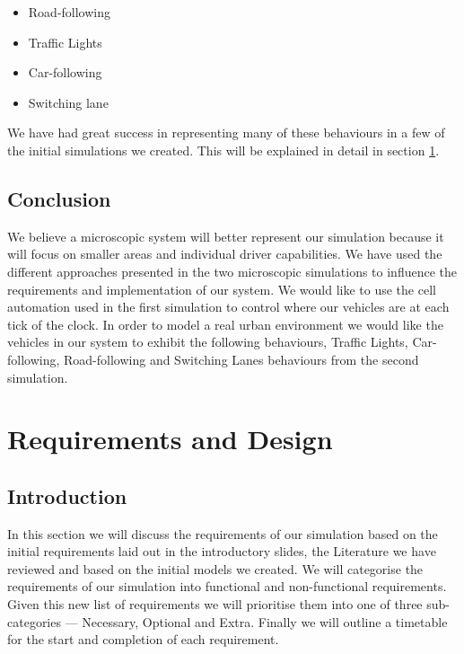 \documentclass{article}
\begin{document}
	\begin{itemize}
		\item Road-following
		\item Traffic Lights
		\item Car-following
		\item Switching lane
	\end{itemize}
	 We have had great success in representing many of these behaviours in a few of the initial simulations we created. 
	 This will be explained in detail in section \ref{RequirementsAndDeisgn}. 
	
	
	\subsection{Conclusion}
	We believe a microscopic system will better represent our simulation because it will focus on smaller areas and individual driver capabilities. 
	We have used the different approaches presented in the two microscopic simulations to influence the requirements and implementation of our system. 
	We would like to use the cell automation used in the first simulation to control where our vehicles are at each tick of the clock. 
	In order to model a real urban environment we would like the vehicles in our system to exhibit the following behaviours, Traffic Lights, Car-following, Road-following and Switching Lanes behaviours from the second simulation.
	
%	

\section{Requirements and Design}\label{RequirementsAndDeisgn}

\subsection{Introduction}
	In this section we will discuss the requirements of our simulation based on the initial requirements laid out in the introductory slides, the Literature we have reviewed and based on the initial models we created. 
	We will categorise the requirements of our simulation into functional and non-functional requirements. Given this new list of requirements we will prioritise them into one of three sub-categories  --- Necessary, Optional and Extra. 
	Finally we will outline a timetable for the start and completion of each requirement.  
	
\end{document}
